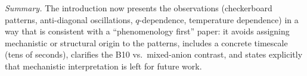 \noindent\textit{Summary.} The introduction now presents the observations (checkerboard patterns, anti-diagonal oscillations, $q$-dependence, temperature dependence) in a way that is consistent with a ``phenomenology first'' paper: it avoids assigning mechanistic or structural origin to the patterns, includes a concrete timescale (tens of seconds), clarifies the B10 vs.\ mixed-anion contrast, and states explicitly that mechanistic interpretation is left for future work.

